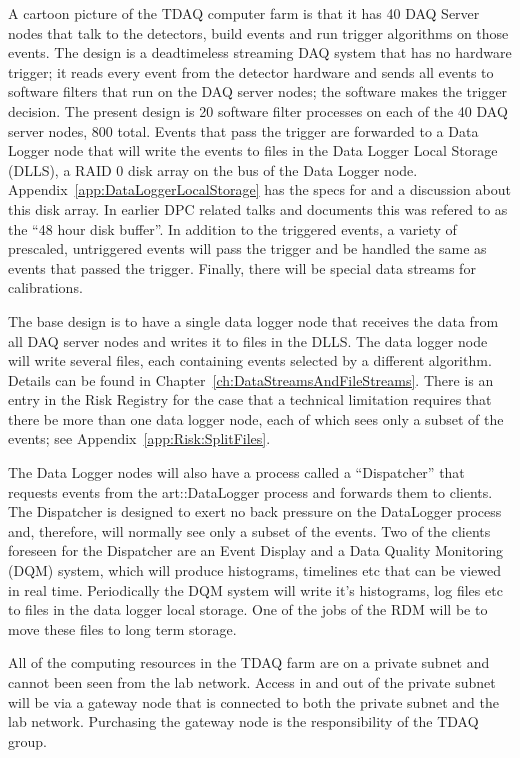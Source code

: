 A cartoon picture of the TDAQ computer farm is that it has 40 DAQ Server nodes
that talk to the detectors, build events and run trigger algorithms on those events.
The design is a deadtimeless streaming DAQ system that has no hardware trigger;
it reads every event from the detector hardware and sends all events to software filters
that run on the DAQ server nodes;
the software makes the trigger decision.
The present design is 20 software filter processes on each of the 40 DAQ server nodes, 800 total.
Events that pass the trigger are forwarded to a Data Logger node that will write the events
to files in the Data Logger Local Storage (DLLS), a RAID 0 disk array on the bus of the Data Logger node.
Appendix~\ref{app:DataLoggerLocalStorage} has the specs for and a discussion about this disk array.
In earlier DPC related talks and documents this was refered to as the ``48 hour disk buffer''.
In addition to the triggered events, a variety of prescaled, untriggered events will pass the
trigger and be handled the same as events that passed the trigger.
Finally, there will be special data streams for calibrations.

The base design is to have a single data logger node that receives the data from all DAQ server nodes
and writes it to files in the DLLS.
The data logger node will write several files, each containing events selected by a different algorithm.
Details can be found in Chapter~\ref{ch:DataStreamsAndFileStreams}.
There is an entry in the Risk Registry for the case that a technical limitation requires that
there be more than one data logger node, each of which sees only a subset
of the events; see Appendix~\ref{app:Risk:SplitFiles}.

The Data Logger nodes will also have a process called a ``Dispatcher''
that requests events from the {\code art::DataLogger} process
and forwards them to clients.
The Dispatcher is designed to exert no back pressure on the DataLogger process
and, therefore, will normally see only a subset of the events.
Two of the clients foreseen for the Dispatcher are an Event Display and
a Data Quality Monitoring (DQM) system,
which will produce histograms, timelines etc that can be viewed in real time.
Periodically the DQM system will write it's histograms, log files etc to
files in the data logger local storage.  One of the jobs of the RDM will be
to move these files to long term storage.

All of the computing resources in the TDAQ farm are on a private subnet
and cannot been seen from the lab network.  Access in and out
of the private subnet will be via a gateway node that is connected to
both the private subnet and the lab network.
Purchasing the gateway node is the responsibility of the TDAQ group.

